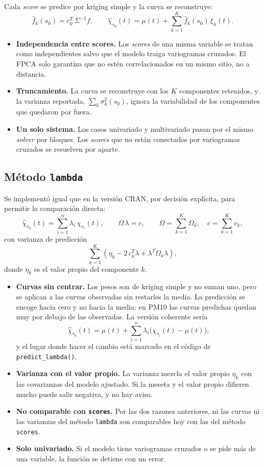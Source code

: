 \documentclass[11pt,a4paper]{article}
\newcommand{\code}[1]{\texttt{#1}}
\begin{document}
Cada \emph{score} se predice por kriging simple y la curva se reconstruye:
\[
  \hat f_k(s_0) = c_0^{T}\,\Sigma^{-1} f,
  \qquad
  \hat\chi_{s_0}(t) = \mu(t) + \sum_{k=1}^{K} \hat f_k(s_0)\,\xi_k(t).
\]
\begin{itemize}
  \item \textbf{Independencia entre scores.} Los \emph{scores} de una misma
        variable se tratan como independientes salvo que el modelo traiga
        variogramas cruzados. El FPCA solo garantiza que no estén
        correlacionados en un mismo sitio, no a distancia.
  \item \textbf{Truncamiento.} La curva se reconstruye con los $K$ componentes
        retenidos, y la varianza reportada, $\sum_k \sigma_k^2(s_0)$, ignora la
        variabilidad de los componentes que quedaron por fuera.
  \item \textbf{Un solo sistema.} Los casos univariado y multivariado pasan
        por el mismo \emph{solver} por bloques. Los \emph{scores} que no están
        conectados por variogramas cruzados se resuelven por aparte.
\end{itemize}

\subsection{Método \code{lambda}}

Se implementó igual que en la versión CRAN, por decisión explícita, para
permitir la comparación directa:
\[
  \hat\chi_{s_0}(t) = \sum_{i=1}^{n} \lambda_i\,\chi_{s_i}(t),
  \qquad
  \Omega\,\lambda = c,
  \qquad
  \Omega = \sum_{k=1}^{K}\Omega_k,\quad c = \sum_{k=1}^{K} c_k ,
\]
con varianza de predicción
\[
  \sum_{k=1}^{K}\left(\eta_k - 2\,c_k^{T}\lambda + \lambda^{T}\Omega_k\lambda\right),
\]
donde $\eta_k$ es el valor propio del componente $k$.
\begin{itemize}
  \item \textbf{Curvas sin centrar.} Los pesos son de kriging simple y no
        suman uno, pero se aplican a las curvas observadas sin restarles la
        media. La predicción se encoge hacia cero y no hacia la media: en PM10
        las curvas predichas quedan muy por debajo de las observadas. La
        versión coherente sería
        \[
          \hat\chi_{s_0}(t) = \mu(t) + \sum_{i=1}^{n}\lambda_i
          \bigl(\chi_{s_i}(t) - \mu(t)\bigr),
        \]
        y el lugar donde hacer el cambio está marcado en el código de
        \code{predict\_lambda()}.
  \item \textbf{Varianza con el valor propio.} La varianza mezcla el valor
        propio $\eta_k$ con las covarianzas del modelo ajustado. Si la meseta
        y el valor propio difieren mucho puede salir negativa, y no hay aviso.
  \item \textbf{No comparable con \code{scores}.} Por las dos razones
        anteriores, ni las curvas ni las varianzas del método \code{lambda}
        son comparables hoy con las del método \code{scores}.
  \item \textbf{Solo univariado.} Si el modelo tiene variogramas cruzados o se
        pide más de una variable, la función se detiene con un error.
\end{itemize}
\end{document}
